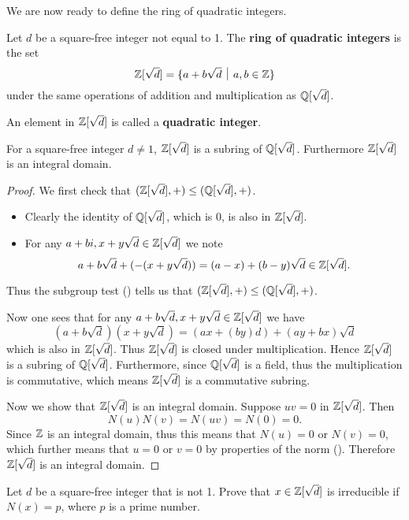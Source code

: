 We are now ready to define the ring of quadratic integers.
\begin{definition}
    Let $d$ be a square-free integer not equal to 1. The \textbf{ring of quadratic integers} is the set
    \[
        \Z[\sqrt{d}] = \{a + b\sqrt{d} \vert a,b\in\Z\}
    \]
    under the same operations of addition and multiplication as $\mathbb{Q}[\sqrt{d}]$.

    An element in $\mathbb{Z}[\sqrt{d}]$ is called a \textbf{quadratic integer}.
\end{definition}
\begin{proposition}
    For a square-free integer $d \neq 1$, $\mathbb{Z}[\sqrt{d}]$ is a subring of $\mathbb{Q}[\sqrt{d}]$. Furthermore $\mathbb{Z}[\sqrt{d}]$ is an integral domain.
\end{proposition}
\begin{proof}
    We first check that $(\mathbb{Z}[\sqrt{d}], +) \leq (\mathbb{Q}[\sqrt{d}], +)$.
    \begin{itemize}
        \item Clearly the identity of $\mathbb{Q}[\sqrt{d}]$, which is 0, is also in $\mathbb{Z}[\sqrt{d}]$.
        \item For any $a+bi, x+y\sqrt{d} \in \mathbb{Z}[\sqrt{d}]$ we note
        \[
            a + b\sqrt{d} + (-(x+y\sqrt{d})) = (a-x) + (b-y)\sqrt{d} \in \mathbb{Z}[\sqrt{d}].
        \]
    \end{itemize}
    Thus the subgroup test () tells us that $(\mathbb{Z}[\sqrt{d}], +) \leq (\mathbb{Q}[\sqrt{d}], +)$.

    Now one sees that for any $a+b\sqrt{d}, x+y\sqrt{d} \in \mathbb{Z}[\sqrt{d}]$ we have
    \[
        (a+b\sqrt{d})(x+y\sqrt{d}) = (ax+(by)d) + (ay+bx)\sqrt{d}
    \]
    which is also in $\mathbb{Z}[\sqrt{d}]$. Thus $\mathbb{Z}[\sqrt{d}]$ is closed under multiplication. Hence $\mathbb{Z}[\sqrt{d}]$ is a subring of $\mathbb{Q}[\sqrt{d}]$. Furthermore, since $\mathbb{Q}[\sqrt{d}]$ is a field, thus the multiplication is commutative, which means $\mathbb{Z}[\sqrt{d}]$ is a commutative subring.

    Now we show that $\mathbb{Z}[\sqrt{d}]$ is an integral domain. Suppose $uv = 0$ in $\mathbb{Z}[\sqrt{d}]$. Then
    \[
        N(u)N(v) = N(uv) = N(0) = 0.
    \]
    Since $\mathbb{Z}$ is an integral domain, thus this means that $N(u) = 0$ or $N(v) = 0$, which further means that $u = 0$ or $v = 0$ by properties of the norm (). Therefore $\mathbb{Z}[\sqrt{d}]$ is an integral domain.
\end{proof}

\begin{exercise}\label{exercise-quadratic-integer-irreducible-if-norm-is-prime}
    Let $d$ be a square-free integer that is not 1. Prove that $x \in \mathbb{Z}[\sqrt{d}]$ is irreducible if $N(x) = p$, where $p$ is a prime number.
\end{exercise}

